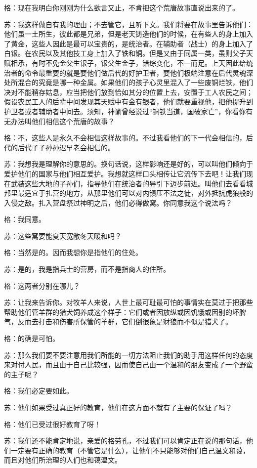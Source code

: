 \documentclass[11pt,oneside]{book}
\begin{document}
\begin{common-format}
格：现在我明白你刚刚为什么欲言又止，不肯把这个荒唐故事直说出来的了。

苏：我这样做自有我的理由；不去管它，且听下文。我们将要在故事里告诉他们：他们虽一土所生，彼此都是兄弟，但是老天铸造他们的时候，在有些人的身上加入了黄金，这些人因此是最可以宝贵的，是统治者。在辅助者（战士）的身上加入了白银。在农民以及其他技工身上加入了铁和铜。但是又由于同属一类，虽则父子天赋相承，有时不免金父生银子，银父生金子，错综变化，不一而足。上天因此给统治者的命令最重要的就是要他们做后代的好护卫者，要他们极端注意在后代灵魂深处所混合的究竟是哪一种金属。如果他们的孩子心灵里混入了一些废铜烂铁，他们决对不能稍存姑息，应当把他们放到恰如其分的位置上去，安置于工人农民之间；假设农民工人的后辈中间发现其天赋中有金有银者，他们就要重视他，把他提升到护卫者或者辅助者中间去。须知，神谕曾经说过“铜铁当道，国破家亡”，你看你有无办法叫他们相信这个荒唐的故事？

格：不，这些人是永久不会相信这样故事的。不过我看他们的下一代会相信的，后代的后代子子孙孙迟早老会相信的。

苏：我想我是理解你的意思的。换句话说，这样影响还是好的，可以叫他们倾向于爱护他们的国家与他们相互爱护。我想就这样口头相传让它流传下去吧！让我们现在武装这些大地的子孙们，指导他们在统治者的导引下迈步前进。叫他们去看看城邦里最适宜于扎营的地方，从那里他们可以对内镇压不法之徒，对外抵抗虎狼般的入侵之敌。扎入营盘祭过神明之后，他们必得做窝。你同意我这个说法吗？

格：我同意。

苏：这些窝要能夏天宽敞冬天暖和吗？

格：当然是的。因而我想你是指他们的住处。

苏：是的，我是指兵士的营房，而不是指商人的住所。

格：这两者分别在哪儿？

苏：让我来告诉你。对牧羊人来说，人世上最可耻最可怕的事情实在莫过于把那些帮助他们管羊群的猎犬饲养成这个样子：它们或者因放纵或因饥饿或因别的坏脾气，反而去打击和伤害所保管的羊群，它们倒很象是豺狼而不似是猎犬了。

格：的确是可怕。

苏：那么我们要不要注意用我们所能的一切方法阻止我们的助手用这样任何的态度来对付人民，而且由于自己比较强，因而使自己由一个温和的朋友变成了一个野蛮的主子呢？

格：我们必定要如此。

苏：他们如果受过真正好的教育，他们在这方面不就有了主要的保证了吗？

格：他们已受过很好教育了呀！

苏：我们还不能肯定地说，亲爱的格劳孔，不过我们可以肯定正在说的那句话，他们一定要有正确的教育（不管它是什么），让他们不只能够对他们自己温文和蔼，而且对他们所治理的人们也和蔼温文。


\end{common-format}
\end{document}

